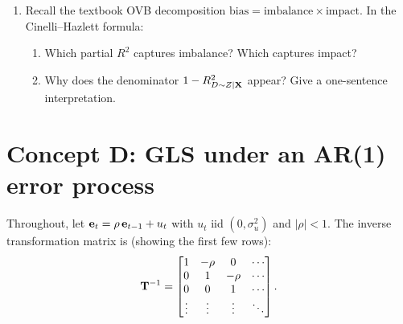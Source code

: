 \documentclass{article}
\begin{document}
\begin{enumerate}[label=\textbf{C.\arabic*},leftmargin=*,itemsep=10pt]
\item  Recall the textbook OVB decomposition $\text{bias} = \text{imbalance} \times \text{impact}$.  In the Cinelli--Hazlett formula:
\begin{enumerate}[label=(\alph*)]
  \item Which partial $R^2$ captures imbalance?  Which captures impact?
  \item Why does the denominator $1 - R^2_{D\sim Z\mid {\mathbf X}}$ appear?  Give a one-sentence interpretation.
\end{enumerate}

\end{enumerate}

\bigskip

\section*{Concept D: GLS under an AR(1) error process}

Throughout, let ${\mathbf e}_t = \rho\,{\mathbf e}_{t-1} + u_t$ with $u_t$ iid $(0, \sigma_u^2)$ and $|\rho| < 1$.  The inverse transformation matrix is (showing the first few rows):
$${\mathbf T}^{-1} = \begin{bmatrix}
1 & -\rho & 0 & \cdots \\
0 & 1 & -\rho & \cdots \\
0 & 0 & 1 & \cdots \\
\vdots & \vdots & \vdots & \ddots
\end{bmatrix}.$$
\end{document}
